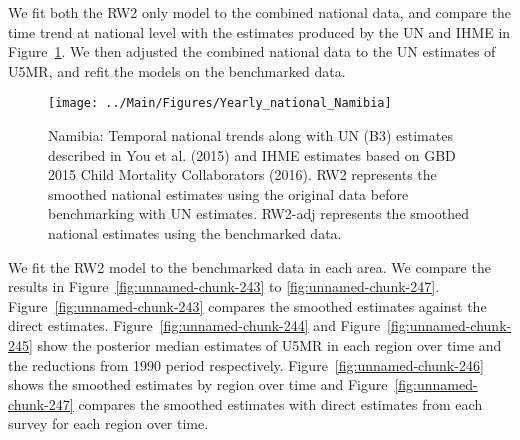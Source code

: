 \documentclass[12pt]{article}\usepackage[]{graphicx}\usepackage[]{color}
\newenvironment{knitrout}{}{} %
\begin{document}
We fit both the RW2 only model to the combined national data, and compare the time trend at national level with the estimates produced by the UN and IHME in Figure~\ref{fig:unnamed-chunk-242}. We then adjusted the combined national data to the UN estimates of U5MR, and refit the models on the benchmarked data. 

\begin{knitrout}
\color{fgcolor}\begin{figure}[bht]

{\centering \texttt{[image: ../Main/Figures/Yearly\_national\_Namibia]} 

}

\caption[Namibia]{Namibia: Temporal national trends along with UN (B3) estimates described in You et al. (2015) and IHME estimates based on GBD 2015 Child Mortality Collaborators (2016). RW2 represents the smoothed national estimates using the original data before benchmarking with UN estimates. RW2-adj represents the smoothed national estimates using the benchmarked data.}\label{fig:unnamed-chunk-242}
\end{figure}


\end{knitrout}
 

We fit the RW2 model to the benchmarked data in each area. 
We compare the results in Figure~\ref{fig:unnamed-chunk-243} to \ref{fig:unnamed-chunk-247}.
Figure~\ref{fig:unnamed-chunk-243} compares the smoothed estimates against the direct estimates. Figure~\ref{fig:unnamed-chunk-244} and Figure~\ref{fig:unnamed-chunk-245} show the posterior median estimates of U5MR in each region over time and the reductions from 1990 period respectively.
Figure~\ref{fig:unnamed-chunk-246} shows the smoothed estimates by region over time and Figure~\ref{fig:unnamed-chunk-247} compares the smoothed estimates with direct estimates from each survey for each region over time.




\end{document}
